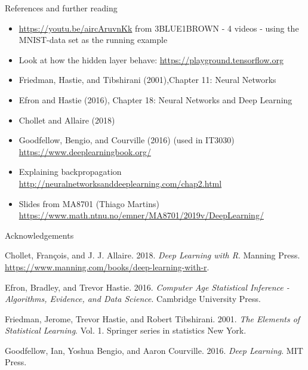 \documentclass[10pt,ignorenonframetext,]{beamer}
\providecommand{\tightlist}{%
  \setlength{\itemsep}{0pt}\setlength{\parskip}{0pt}}
\begin{document}
\begin{frame}{References and further reading}
\protect\hypertarget{references-and-further-reading}{}

\begin{itemize}
\tightlist
\item
  \url{https://youtu.be/aircAruvnKk} from 3BLUE1BROWN - 4 videos - using
  the MNIST-data set as the running example
\item
  Look at how the hidden layer behave:
  \url{https://playground.tensorflow.org}
\item
  Friedman, Hastie, and Tibshirani (2001),Chapter 11: Neural Networks
\item
  Efron and Hastie (2016), Chapter 18: Neural Networks and Deep Learning
\item
  Chollet and Allaire (2018)
\item
  Goodfellow, Bengio, and Courville (2016) (used in IT3030)
  \url{https://www.deeplearningbook.org/}
\item
  Explaining backpropagation
  \url{http://neuralnetworksanddeeplearning.com/chap2.html}
\item
  Slides from MA8701 (Thiago Martins)
  \url{https://www.math.ntnu.no/emner/MA8701/2019v/DeepLearning/}
\end{itemize}

\end{frame}

\begin{frame}{Acknowledgements}
\protect\hypertarget{acknowledgements-1}{}

\hypertarget{refs}{}
\leavevmode\hypertarget{ref-kerasR}{}%
Chollet, François, and J. J. Allaire. 2018. \emph{Deep Learning with R}.
Manning Press. \url{https://www.manning.com/books/deep-learning-with-r}.

\leavevmode\hypertarget{ref-casi}{}%
Efron, Bradley, and Trevor Hastie. 2016. \emph{Computer Age Statistical
Inference - Algorithms, Evidence, and Data Science}. Cambridge
University Press.

\leavevmode\hypertarget{ref-ESL}{}%
Friedman, Jerome, Trevor Hastie, and Robert Tibshirani. 2001. \emph{The
Elements of Statistical Learning}. Vol. 1. Springer series in statistics
New York.

\leavevmode\hypertarget{ref-goodfellow}{}%
Goodfellow, Ian, Yoshua Bengio, and Aaron Courville. 2016. \emph{Deep
Learning}. MIT Press.

\end{frame}
\end{document}

